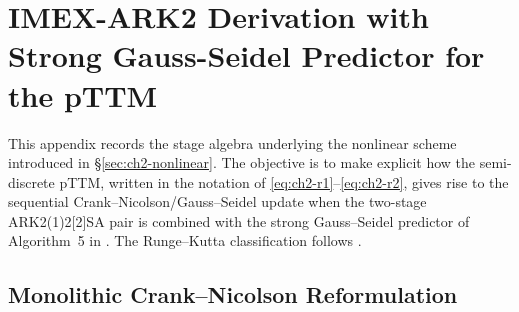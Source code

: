 \chapter{IMEX-ARK2 Derivation with Strong Gauss-Seidel Predictor for the pTTM}
\label{app:imex-derivation}

This appendix records the stage algebra underlying the nonlinear scheme introduced in \S\ref{sec:ch2-nonlinear}. The objective is to make explicit how the semi-discrete pTTM, written in the notation of \eqref{eq:ch2-r1}--\eqref{eq:ch2-r2}, gives rise to the sequential Crank--Nicolson/Gauss--Seidel update when the two-stage ARK2(1)2[2]SA pair is combined with the strong Gauss--Seidel predictor of Algorithm~5 in \cite{Huang_2019}. The Runge--Kutta classification follows \cite{Ascher_1997,Kennedy_2003}.

\section{Monolithic Crank--Nicolson Reformulation}

